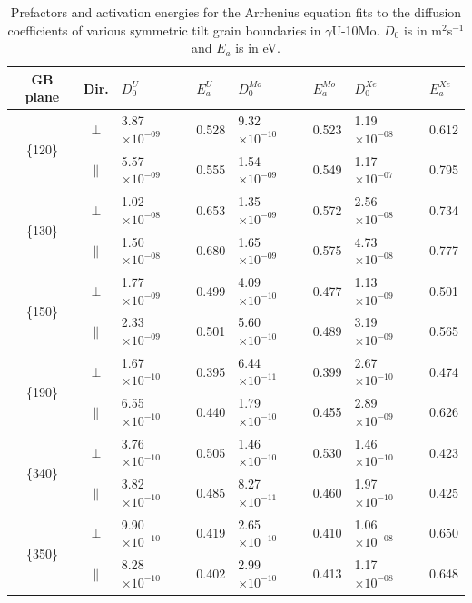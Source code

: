 \documentclass{elsarticle}
\begin{document}
\begin{table}[!ht]
\centering
\caption{Prefactors and activation energies for the Arrhenius equation fits to the diffusion coefficients of various symmetric tilt grain boundaries in $\gamma$U-10Mo. $D_0$ is in m$^2$s$^{-1}$ and $E_a$ is in eV.}
\label{tab:u10moArr}
\begin{tabular}{ccllllll}
\toprule
GB plane & Dir.
	& $D_{0}^U$     & $E_{a}^U$
	& $D_{0}^{Mo}$  & $E_{a}^{Mo}$
	& $D_{0}^{Xe}$  & $E_{a}^{Xe}$ \\
\midrule
\multirow{2}{*}{ \{120\} }
		& $\perp$
		& 3.87 $\times 10^{-09}$ & 0.528
        & 9.32 $\times 10^{-10}$ & 0.523
        & 1.19 $\times 10^{-08}$ & 0.612  \\
        & $\parallel$
		& 5.57 $\times 10^{-09}$ & 0.555
        & 1.54 $\times 10^{-09}$ & 0.549
		& 1.17 $\times 10^{-07}$ & 0.795  \vspace{0.2cm } \\
\multirow{2}{*}{ \{130\} }
		& $\perp$
		& 1.02 $\times 10^{-08}$ & 0.653
        & 1.35 $\times 10^{-09}$ & 0.572
        & 2.56 $\times 10^{-08}$ & 0.734  \\
        & $\parallel$
		& 1.50 $\times 10^{-08}$ & 0.680
        & 1.65 $\times 10^{-09}$ & 0.575
        & 4.73 $\times 10^{-08}$ & 0.777  \vspace{0.2cm } \\
\multirow{2}{*}{ \{150\} }
		& $\perp$
		& 1.77 $\times 10^{-09}$ & 0.499
        & 4.09 $\times 10^{-10}$ & 0.477
        & 1.13 $\times 10^{-09}$ & 0.501  \\
        & $\parallel$
		& 2.33 $\times 10^{-09}$ & 0.501
        & 5.60 $\times 10^{-10}$ & 0.489
        & 3.19 $\times 10^{-09}$ & 0.565  \vspace{0.2cm } \\
\multirow{2}{*}{ \{190\} }
		& $\perp$
		& 1.67 $\times 10^{-10}$ & 0.395
        & 6.44 $\times 10^{-11}$ & 0.399
        & 2.67 $\times 10^{-10}$ & 0.474  \\
        & $\parallel$
		& 6.55 $\times 10^{-10}$ & 0.440
        & 1.79 $\times 10^{-10}$ & 0.455
        & 2.89 $\times 10^{-09}$ & 0.626  \vspace{0.2cm } \\
\multirow{2}{*}{ \{340\} }
		& $\perp$
		& 3.76 $\times 10^{-10}$ & 0.505
        & 1.46 $\times 10^{-10}$ & 0.530
        & 1.46 $\times 10^{-10}$ & 0.423  \\
        & $\parallel$
		& 3.82 $\times 10^{-10}$ & 0.485
        & 8.27 $\times 10^{-11}$ & 0.460
        & 1.97 $\times 10^{-10}$ & 0.425  \vspace{0.2cm } \\
\multirow{2}{*}{ \{350\} }
		& $\perp$
		& 9.90 $\times 10^{-10}$ & 0.419
        & 2.65 $\times 10^{-10}$ & 0.410
        & 1.06 $\times 10^{-08}$ & 0.650  \\
        & $\parallel$
		& 8.28 $\times 10^{-10}$ & 0.402
        & 2.99 $\times 10^{-10}$ & 0.413
        & 1.17 $\times 10^{-08}$ & 0.648  \\
\bottomrule
\end{tabular}
\end{table}
\end{document}
